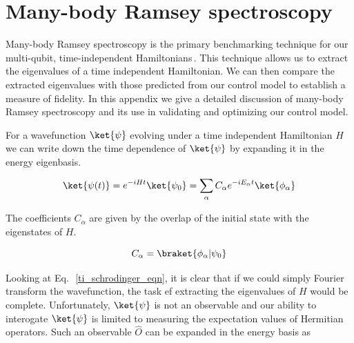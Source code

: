 

\section{Many-body Ramsey spectroscopy}
\label{sec:mbr}

Many-body Ramsey spectroscopy is the primary benchmarking technique for our multi-qubit, time-independent Hamiltonians\,\cite{Roushan2018}.
This technique allows us to extract the eigenvalues of a time independent Hamiltonian.
We can then compare the extracted eigenvalues with those predicted from our control model to establish a measure of fidelity.
In this appendix we give a detailed discussion of many-body Ramsey spectroscopy and its use in validating and optimizing our control model.

For a wavefunction $\ket{\psi}$ evolving under a time independent Hamiltonian $H$ we can write down the time dependence of $\ket{\psi}$ by expanding it in the
energy eigenbasis.

\begin{equation}
    \ket{\psi (t)} =e^{-i H t} \ket{\psi_{0}} = \sum_{\alpha} C_{\alpha} e^{-i E_{\alpha} t} \ket{\phi_{\alpha}}
    \label{ti_schrodinger_eqn}
\end{equation}

\noindent The coefficients $C_{\alpha}$ are given by the overlap of the initial state with the eigenstates of $H$.

\begin{equation}
    C_{\alpha} = \braket{\phi_{\alpha}|\psi_{0}}
\end{equation}

\noindent Looking at Eq.\,~\ref{ti_schrodinger_eqn}, it is clear that if we could simply Fourier transform the wavefunction, the task ef extracting the eigenvalues of $H$ would be complete.
Unfortunately, $\ket{\psi}$ is not an observable and our ability to interogate $\ket{\psi}$ is limited to measuring the expectation values of Hermitian operators.
Such an observable $\hat{O}$ can be expanded in the energy basis as


